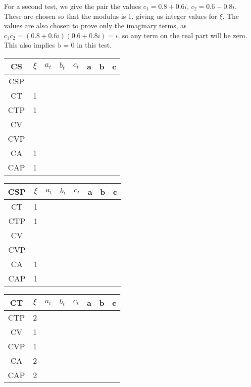 \documentclass[twocolumn]{article}
\begin{document}
For a second test, we give the pair the values $c_1 = 0.8 + 0.6i$, $c_2 = 0.6 - 0.8i$. These are chosen so that the modulus is 1, giving us integer values for $\xi$. The values are also chosen to prove only the imaginary terms, as $c_1\overline{c_2} = (0.8+0.6i)(0.6+0.8i) = i$, so any term on the real part will be zero. This also implies b = 0  in this test.

\begin{table}[H]
	\begin{tabular}{|c|c|c|c|c|c|c|c|}
		\hline
		CS & $\xi $& $a_t$ & $b_t$ & $c_t$ & a & b & c \\
		\hline
		CSP &   &   &   &   &   &   &   \\
		\hline
		CT & 1 &   &   &   &   &   &   \\
		\hline
		CTP & 1 &   &   &   &   &   &   \\
		\hline
		CV &   &   &   &   &   &   &   \\
		\hline
		CVP &   &   &   &   &   &   &   \\
		\hline
		CA & 1 &   &   &   &   &   &   \\
		\hline
		CAP & 1 &   &   &   &   &   &   \\
		\hline
	\end{tabular}
\end{table}

\begin{table}[H]
	\begin{tabular}{|c|c|c|c|c|c|c|c|}
		\hline
		CSP & $\xi $& $a_t$ & $b_t$ & $c_t$ & a & b & c \\
		\hline
		CT & 1 &   &   &   &   &   &   \\
		\hline
		CTP & 1 &   &   &   &   &   &   \\
		\hline
		CV &   &   &   &   &   &   &   \\
		\hline
		CVP &   &   &   &   &   &   &   \\
		\hline
		CA & 1 &   &   &   &   &   &   \\
		\hline
		CAP & 1 &   &   &   &   &   &   \\
		\hline
	\end{tabular}
\end{table}

\begin{table}[H]
	\begin{tabular}{|c|c|c|c|c|c|c|c|}
		\hline
		CT & $\xi $& $a_t$ & $b_t$ & $c_t$ & a & b & c \\
		\hline
		CTP & 2 &   &   &   &   &   &   \\
		\hline
		CV & 1 &   &   &   &   &   &   \\
		\hline
		CVP & 1 &   &   &   &   &   &   \\
		\hline
		CA & 2 &   &   &   &   &   &   \\
		\hline
		CAP & 2 &   &   &   &   &   &   \\
		\hline
	\end{tabular}
\end{table}
\end{document}

